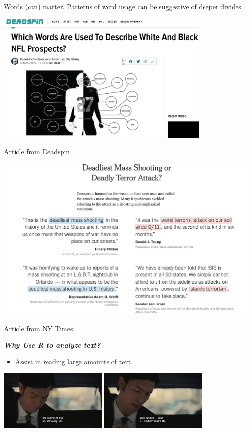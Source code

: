 \documentclass[
  letterpaper,
  DIV=11,
  numbers=noendperiod]{scrreprt}
\providecommand{\tightlist}{%
  \setlength{\itemsep}{0pt}\setlength{\parskip}{0pt}}\usepackage{longtable,booktabs,array}
\begin{document}
Words (can) matter. Patterns of word usage can be suggestive of deeper
divides.

\includegraphics[width=0.8\textwidth,height=\textheight]{images/deadspin.png}

Article from
\href{https://deadspin.com/which-words-are-used-to-describe-white-and-black-nfl-pr-1573683214}{Deadspin}

\includegraphics{images/wordsmass.png}

Article from
\href{https://www.nytimes.com/interactive/2016/06/13/us/politics/politicians-respond-to-orlando-nightclub-attack.html}{NY
Times}

\textbf{\emph{Why Use R to analyze text?}}

\begin{itemize}
\tightlist
\item
  Assist in reading large amounts of text
\end{itemize}

\includegraphics[width=0.4\textwidth,height=\textheight]{images/greg1.jpg}
\includegraphics[width=0.4\textwidth,height=\textheight]{images/greg2.jpg}
\end{document}
